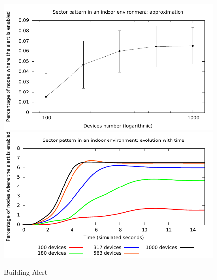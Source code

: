 \documentclass[12pt,a4paper,twoside,openright]{book}
\begin{document}
\begin{figure}
	\centering
	\includegraphics[width=\textwidth]{img/tetc-graphs/mit-approx-nosmooth}
	\includegraphics[width=\textwidth]{img/tetc-graphs/mit-time}
	\caption{Building Alert}
	\label{f:tests-mit}
\end{figure}
\end{document}
